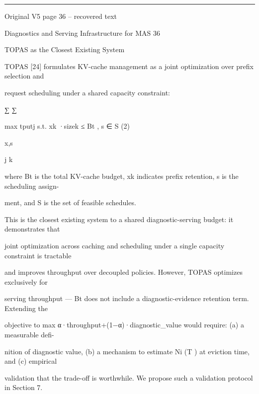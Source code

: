 \par\smallskip\noindent\rule{\textwidth}{0.4pt}\par{\sffamily\footnotesize Original V5 page 36 -- recovered text}\par\begin{flushleft}\footnotesize\ttfamily
\par\smallskip
\par\smallskip
\noindent Diagnostics and Serving Infrastructure for MAS 36\par
\par\smallskip
\par\smallskip
\par\smallskip
{} TOPAS as the Closest Existing System\par
\noindent TOPAS [24] formulates KV-cache management as a joint optimization over prefix selection and\par
\noindent request scheduling under a shared capacity constraint:\par
\noindent  ∑ ∑\par
\noindent  max tputj s.t. xk ·sizek ≤ Bt , s ∈ S (2)\par
\noindent  x,s\par
\noindent  j k\par
\par\smallskip
\noindent where Bt is the total KV-cache budget, xk indicates prefix retention, s is the scheduling assign-\par
\noindent ment, and S is the set of feasible schedules.\par
\noindent  This is the closest existing system to a shared diagnostic-serving budget: it demonstrates that\par
\noindent joint optimization across caching and scheduling under a single capacity constraint is tractable\par
\noindent and improves throughput over decoupled policies. However, TOPAS optimizes exclusively for\par
\noindent serving throughput — Bt does not include a diagnostic-evidence retention term. Extending the\par
\noindent objective to max α·throughput+(1−α)·diagnostic\_value would require: (a) a measurable defi-\par
\noindent nition of diagnostic value, (b) a mechanism to estimate Ni (T ) at eviction time, and (c) empirical\par
\noindent validation that the trade-off is worthwhile. We propose such a validation protocol in Section 7.\par

\end{flushleft}
